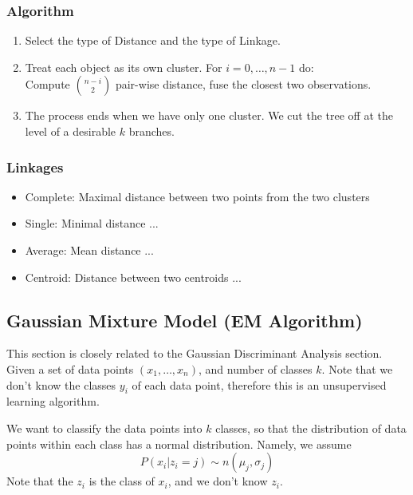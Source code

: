 \documentclass[12pt]{amsart}
\numberwithin{equation}{section}
\theoremstyle{plain}
\theoremstyle{definition}
\begin{document}
\subsubsection{Algorithm}
\begin{enumerate}
\item Select the type of Distance and the type of Linkage.
\item Treat each object as its own cluster. For $i = 0, \ldots, n-1$ do:\\ Compute ${n-i}\choose{2}$ pair-wise distance, fuse the closest two observations.
\item The process ends when we have only one cluster. We cut the tree off at the level of a desirable $k$ branches.
\end{enumerate}

\subsubsection{Linkages}
\begin{itemize}
\item Complete: Maximal distance between two points from the two clusters
\item Single: Minimal distance ...
\item Average: Mean distance ...
\item Centroid: Distance between two centroids ...
\end{itemize}

\subsection{Gaussian Mixture Model (EM Algorithm)}

This section is closely related to the Gaussian Discriminant Analysis section. Given a set of data points $(x_1,\ldots, x_n)$, and number of classes $k$. Note that we don't know the classes $y_i$ of each data point, therefore this is an unsupervised learning algorithm.

We want to classify the data points into $k$ classes, so that the distribution of data points within each class has a normal distribution. Namely, we assume 
$$
P(x_i|z_i=j) \sim n(\mu_j,\sigma_j)
$$
Note that the $z_i$ is the class of $x_i$, and we don't know $z_i$.
\end{document}
